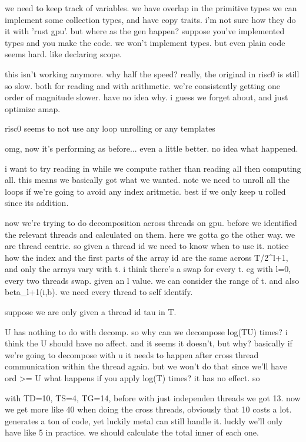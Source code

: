 we need to keep track of variables.
we have overlap in the primitive types
we can implement some collection types, and have copy traits. 
i'm not sure how they do it with 'rust gpu'.
but where as the gen happen?
suppose you've implemented types and you make the code. 
we won't implement types.
but even plain code seems hard.
like declaring scope. 


this isn't working anymore. why half the speed?
really, the original in risc0 is still so slow. 
both for reading and with arithmetic. 
we're consistently getting one order of magnitude slower. 
have no idea why. i guess we forget about, and just optimize amap. 

risc0 seems to not use any loop unrolling or any templates

omg, now it's performing as before... 
even a little better.
no idea what happened.

i want to try reading in while we compute rather than reading all then computing all. 
this means 
we basically got what we wanted. 
note we need to unroll all the loops if we're going to avoid any index aritmetic. best if we only keep u rolled since its addition. 

now we're trying to do decomposition across threads on gpu.
before we identified the relevant threads and calculated on them.
here we gotta go the other way. we are thread centric. so given a thread id we need to know when to use it. 
notice how the index and the first parts of the array id are the same across T/2^{l+1}, and only the arrays vary with t. i think there's a swap for every t. eg with l=0, every two threads swap.
given an l value. we can consider the range of t. and also beta_{l+1}(i,b).
we need every thread to self identify. 

suppose we are only given a thread id tau in T. 

U has nothing to do with decomp.
so why can we decompose log(TU) times?
i think the U should have no affect. and it seems it doesn't, but why?
basically if we're going to decompose with u it needs to happen after cross thread communication within the thread again.
but we won't do that since we'll have ord >= U
what happens if you apply log(T) times? it has no effect.
so 



with TD=10, TS=4, TG=14,
before with just independen threads we got 13.
now we get more like 40 when doing the cross threads, obviously that 10 costs a lot. generates a ton of code, yet luckily metal can still handle it. 
luckly we'll only have like 5 in practice. 
we should calculate the total inner of each one.

